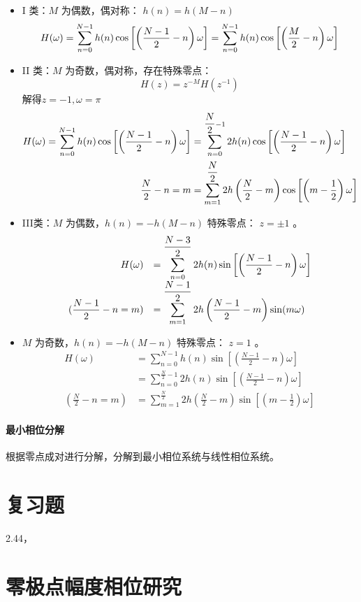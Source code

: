 \documentclass[cn,11pt,chinese,black,simple]{elegantbook}
\begin{document}
\begin{itemize}
    \item I 类：\(M\) 为偶数，偶对称： \(h(n) = h(M-n)\) \[
        H(\omega)=\displaystyle\sum_{n=0}^{N-1} h(n) \cos \left[\left(\dfrac{N-1}{2}-n\right) \omega\right] = \displaystyle\sum_{n=0}^{N-1} h(n) \cos \left[\left(\dfrac{M}{2}-n\right) \omega\right]
        \]
    \item II 类：\(M\) 为奇数，偶对称，存在特殊零点： \[
        H(z)=z^{-M} H\left(z^{-1}\right)
        \] 解得\(z = -1, \omega = \pi\) \[
            \begin{aligned}
            H(\omega)=\displaystyle\sum_{n=0}^{N-1} h(n) \cos \left[\left(\dfrac{N-1}{2}-n\right) \omega\right] &=\displaystyle\sum_{n=0}^{\dfrac{N}{2}-1} 2 h(n) \cos \left[\left(\dfrac{N-1}{2}-n\right) \omega\right] \\
            \text {  } \dfrac{N}{2}-n=m &=\displaystyle\sum_{m=1}^{\dfrac{N}{2}} 2 h\left(\dfrac{N}{2}-m\right) \cos \left[\left(m-\dfrac{1}{2}\right) \omega\right]
            \end{aligned}
            \]
    \item III类：\(M\) 为偶数，\(h(n) = -h(M-n)\) 特殊零点： \(z = \pm 1\) 。\[
        \begin{array}{rl}
        H(\omega) & =\displaystyle\sum_{n=0}^{\dfrac{N-3}{2}} 2 h(n) \sin \left[\left(\dfrac{N-1}{2}-n\right) \omega\right] \\
         (\dfrac{N-1}{2}-n=m) & =\displaystyle\sum_{m=1}^{\dfrac{N-1}{2}} 2 h\left(\dfrac{N-1}{2}-m\right) \sin (m \omega)
        \end{array}
        \]
    \item \(M\) 为奇数，\(h(n) = -h(M-n)\) 特殊零点： \(z = 1\) 。\[
            \begin{aligned}
                H(\omega)&=\sum_{n=0}^{N-1} h(n) \sin \left[\left(\frac{N-1}{2}-n\right) \omega\right] \\
                & =\sum_{n=0}^{\frac{N}{2}-1} 2 h(n) \sin \left[\left(\frac{N-1}{2}-n\right) \omega\right] \\
                (\frac{N}{2}-n=m) &=\sum_{m=1}^{\frac{N}{2}} 2 h\left(\frac{N}{2}-m\right) \sin \left[\left(m-\frac{1}{2}\right) \omega\right]
            \end{aligned}
        \]
\end{itemize}

\subsubsection{最小相位分解}

根据零点成对进行分解，分解到最小相位系统与线性相位系统。


\chapter{复习题}

2.44，

\appendix

\chapter{零极点幅度相位研究}



\let\chapname\undefined
\ifx\mainclass\undefined
\end{document}
